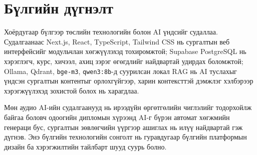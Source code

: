 \section*{Бүлгийн дүгнэлт}
Хоёрдугаар бүлгээр төслийн технологийн болон AI үндсийг судаллаа. Судалгаанаас Next.js, React, TypeScript, Tailwind CSS нь сургалтын веб интерфейсийг модульчлан хөгжүүлэхэд тохиромжтой; Supabase PostgreSQL нь хэрэглэгч, курс, хичээл, ахиц зэрэг өгөгдлийг найдвартай удирдах боломжтой; Ollama, Qdrant, \texttt{bge-m3}, \texttt{qwen3:8b}-д суурилсан локал RAG нь AI туслахыг үндсэн сургалтын контентыг орлохгүйгээр, харин контексттэй дэмжлэг хэлбэрээр хэрэгжүүлэхэд зохистой болох нь харагдлаа.

Мөн аудио AI-ийн судалгаанууд нь ирээдүйн өргөтгөлийн чиглэлийг тодорхойлж байгаа боловч одоогийн дипломын хүрээнд AI-г бүрэн автомат хөгжмийн генераци бус, сургалтын зөвлөгчийн үүргээр ашиглах нь илүү найдвартай гэж дүгнэв. Энэ бүлгийн технологийн сонголт нь гуравдугаар бүлгийн платформын дизайн ба хэрэгжилтийн тайлбарт шууд суурь болно.
